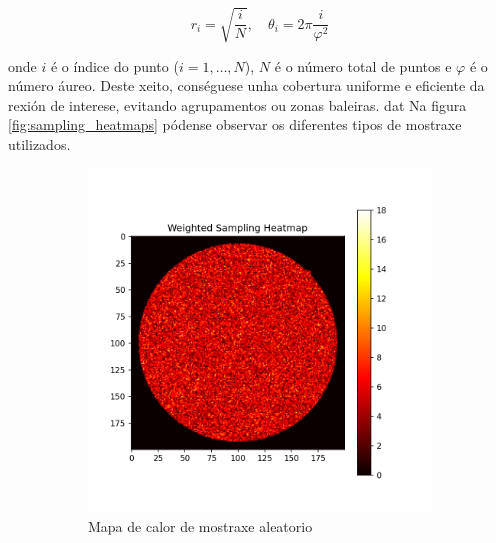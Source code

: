 \[
r_i = \sqrt{\frac{i}{N}}, \quad \theta_i = 2\pi \frac{i}{\varphi^2}
\]

onde $i$ é o índice do punto ($i = 1, \dots, N$), $N$ é o número total de puntos e $\varphi$ é o número áureo. 
Deste xeito, conséguese unha cobertura uniforme e eficiente da rexión de interese, evitando agrupamentos ou zonas baleiras.
 dat
Na figura \ref{fig:sampling_heatmaps} pódense observar os diferentes tipos de mostraxe utilizados.

\begin{figure}[ht]
    \centering
    \begin{subfigure}[b]{0.3\textwidth}
        \centering
        \includegraphics[width=\textwidth]{imaxes/muestraje/random_sampling_heatmap.png}
        \caption{Mapa de calor de mostraxe aleatorio}
        \label{fig:random_sampling_heatmap}
    \end{subfigure}
    \hfill
    \begin{subfigure}[b]{0.3\textwidth}
        \centering

\end{subfigure}
\end{figure}
